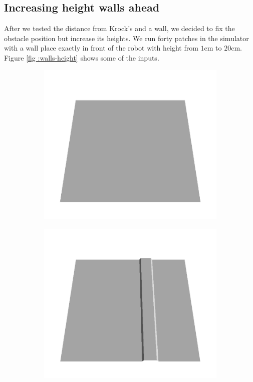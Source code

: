 \documentclass[../document.tex]{subfiles}
\begin{document}
\subsection{Increasing height walls ahead}
After we tested the distance from Krock's and a wall, we decided to fix the obstacle position but increase its heights.  We run forty patches in the simulator with a wall place exactly in front of the robot with height from $1$cm to $20$cm. Figure \ref{fig :walls-height} shows some of the inputs.

\begin{figure} [htbp]
    \centering
    \begin{subfigure}[b]{0.24\textwidth}
    \includegraphics[width=\linewidth]{../img/5/custom_patches/walls_increasing/all/00-3d.png}
    \end{subfigure}
    \begin{subfigure}[b]{0.24\textwidth}
    \includegraphics[width=\linewidth]{../img/5/custom_patches/walls_increasing/all/03-3d.png}

\end{subfigure}
\end{figure}
\end{document}
